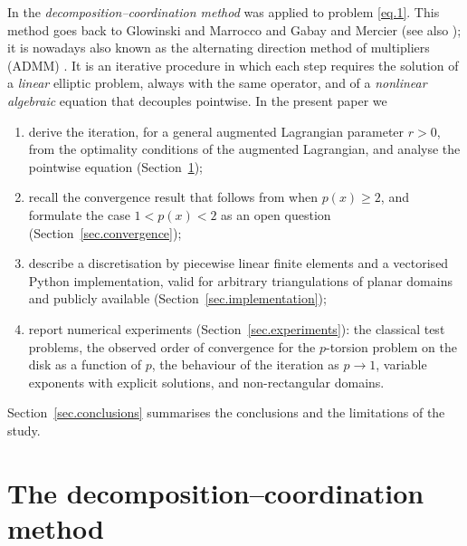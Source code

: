 \documentclass[11pt]{amsart}
\theoremstyle{definition}
\theoremstyle{remark}
\numberwithin{equation}{section}
\begin{document}
In \cite{DPM} the \emph{decomposition--coordination method} was applied to problem \eqref{eq.1}. This method goes back to Glowinski and Marrocco \cite{GM} and Gabay and Mercier \cite{GaM} (see also \cite{FG, Glowinski}); it is nowadays also known as the alternating direction method of multipliers (ADMM) \cite{Boyd}. It is an iterative procedure in which each step requires the solution of a \emph{linear} elliptic problem, always with the same operator, and of a \emph{nonlinear algebraic} equation that decouples pointwise. In the present paper we
\begin{enumerate}
\item derive the iteration, for a general augmented Lagrangian parameter $r>0$, from the optimality conditions of the augmented Lagrangian, and analyse the pointwise equation (Section~\ref{sec.method});
\item recall the convergence result that follows from \cite{Glowinski} when $p(x)\ge2$, and formulate the case $1<p(x)<2$ as an open question (Section~\ref{sec.convergence});
\item describe a discretisation by piecewise linear finite elements and a vectorised Python implementation, valid for arbitrary triangulations of planar domains and publicly available (Section~\ref{sec.implementation});
\item report numerical experiments (Section~\ref{sec.experiments}): the classical test problems, the observed order of convergence for the $p$-torsion problem on the disk as a function of $p$, the behaviour of the iteration as $p\to1$, variable exponents with explicit solutions, and non-rectangular domains.
\end{enumerate}
Section~\ref{sec.conclusions} summarises the conclusions and the limitations of the study.

\section{The decomposition--coordination method}\label{sec.method}
\end{document}
